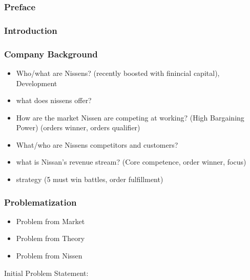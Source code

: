 
\subsubsection{Preface}

\subsubsection{Introduction}

\subsubsection{Company Background} 
    \begin{itemize}
        \item Who/what are Nissens? (recently boosted with finincial capital), Development
        \item what does nissens offer? 
        \item How are the market Nissen are competing at working? (High Bargaining Power) (orders winner, orders qualifier)
            \item What/who are Nissens competitors and customers?
            \item what is Nissan's revenue stream? (Core competence, order winner, focus)
        \item strategy (5 must win battles, order fulfillment)
    \end{itemize}

\subsubsection{Problematization}
    \begin{itemize}
        \item Problem from Market
        \item Problem from Theory
        \item Problem from Nissen
    \end{itemize}

Initial Problem Statement: 

